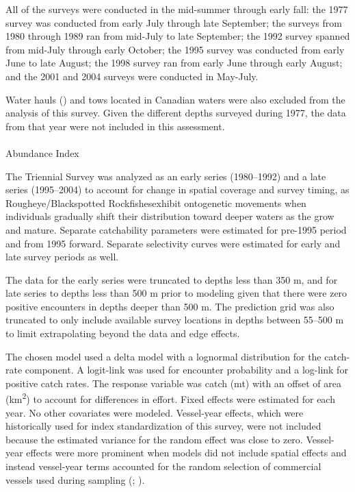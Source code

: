\documentclass[
]{scrartcl}
\makeatletter
\let\oldparagraph\paragraph
\renewcommand{\paragraph}{
    \@ifstar
      \xxxParagraphStar
      \xxxParagraphNoStar
  }
\newcommand{\xxxParagraphStar}[1]{\oldparagraph*{#1}\mbox{}}
\newcommand{\xxxParagraphNoStar}[1]{\oldparagraph{#1}\mbox{}}
\makeatother
\begin{document}
All of the surveys were conducted in the mid-summer through early fall:
the 1977 survey was conducted from early July through late September;
the surveys from 1980 through 1989 ran from mid-July to late September;
the 1992 survey spanned from mid-July through early October; the 1995
survey was conducted from early June to late August; the 1998 survey ran
from early June through early August; and the 2001 and 2004 surveys were
conducted in May-July.

Water hauls () and
tows located in Canadian waters were also excluded from the analysis of
this survey. Given the different depths surveyed during 1977, the data
from that year were not included in this assessment.

\paragraph{Abundance Index}\label{abundance-index-1}

The Triennial Survey was analyzed as an early series (1980--1992) and a
late series (1995--2004) to account for change in spatial coverage and
survey timing, as Rougheye/Blackspotted Rockfishesexhibit ontogenetic
movements when individuals gradually shift their distribution toward
deeper waters as the grow and mature. Separate catchability parameters
were estimated for pre-1995 period and from 1995 forward. Separate
selectivity curves were estimated for early and late survey periods as
well.

The data for the early series were truncated to depths less than 350 m,
and for late series to depths less than 500 m prior to modeling given
that there were zero positive encounters in depths deeper than 500 m.
The prediction grid was also truncated to only include available survey
locations in depths between 55--500 m to limit extrapolating beyond the
data and edge effects.

The chosen model used a delta model with a lognormal distribution for
the catch-rate component. A logit-link was used for encounter
probability and a log-link for positive catch rates. The response
variable was catch (mt) with an offset of area (km\textsuperscript{2})
to account for differences in effort. Fixed effects were estimated for
each year. No other covariates were modeled. Vessel-year effects, which
were historically used for index standardization of this survey, were
not included because the estimated variance for the random effect was
close to zero. Vessel-year effects were more prominent when models did
not include spatial effects and instead vessel-year terms accounted for
the random selection of commercial vessels used during sampling
(;
).
\end{document}
